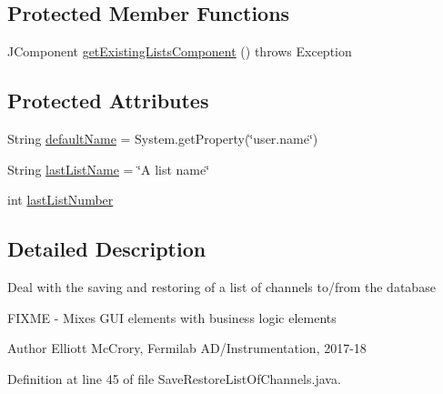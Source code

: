 \subsection*{Protected Member Functions}
\begin{DoxyCompactItemize}
\item 
J\-Component \hyperlink{classgov_1_1fnal_1_1ppd_1_1dd_1_1channel_1_1list_1_1SaveRestoreListOfChannels_a972821afb1b54dfdbca27195608515dd}{get\-Existing\-Lists\-Component} ()  throws Exception 
\end{DoxyCompactItemize}
\subsection*{Protected Attributes}
\begin{DoxyCompactItemize}
\item 
String \hyperlink{classgov_1_1fnal_1_1ppd_1_1dd_1_1channel_1_1list_1_1SaveRestoreListOfChannels_a53fc1fa910b3fdb6367bb2131e0101d2}{default\-Name} = System.\-get\-Property(\char`\"{}user.\-name\char`\"{})
\item 
String \hyperlink{classgov_1_1fnal_1_1ppd_1_1dd_1_1channel_1_1list_1_1SaveRestoreListOfChannels_ab7af798b223d81bf88344bd4691d44c0}{last\-List\-Name} = \char`\"{}A list name\char`\"{}
\item 
int \hyperlink{classgov_1_1fnal_1_1ppd_1_1dd_1_1channel_1_1list_1_1SaveRestoreListOfChannels_a05c358c578a733da611ca47ac0b6fb17}{last\-List\-Number}
\end{DoxyCompactItemize}


\subsection{Detailed Description}
Deal with the saving and restoring of a list of channels to/from the database

F\-I\-X\-M\-E -\/ Mixes G\-U\-I elements with business logic elements

\begin{DoxyAuthor}{Author}
Elliott Mc\-Crory, Fermilab A\-D/\-Instrumentation, 2017-\/18 
\end{DoxyAuthor}


Definition at line 45 of file Save\-Restore\-List\-Of\-Channels.\-java.



